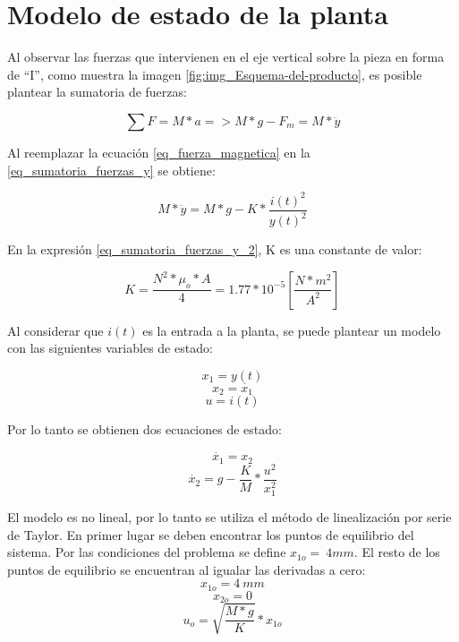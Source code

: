 \section{Modelo de estado de la planta}

\noindent Al observar las fuerzas que intervienen en el eje vertical sobre la pieza en forma de ``I'', como muestra la imagen \ref{fig:img_Esquema-del-producto}, es posible plantear la sumatoria de fuerzas:

\begin{equation}\label{eq_sumatoria_fuerzas_y}
	\sum F=M*a=>M*g-F_{m}=M*\ddot{y}
\end{equation}

\noindent Al reemplazar la ecuación \ref{eq_fuerza_magnetica} en la \ref{eq_sumatoria_fuerzas_y} se obtiene:

\begin{equation}\label{eq_sumatoria_fuerzas_y_2}
	M*\ddot{y}=M*g-K*\frac{i(t)^{2}}{y(t)^{2}}
\end{equation}

\noindent En la expresión \ref{eq_sumatoria_fuerzas_y_2}, K es una constante de valor:

\begin{equation}
	K=\frac{N^{2}*\mu_{o}*A}{4}=1.77*10^{-5} [\frac{N*m^2}{A^2}]
\end{equation}

\noindent Al considerar que $i(t)$ es la entrada a la planta, se puede plantear un modelo con las siguientes variables de estado:\newline

\begin{equation}
	x_{1}=y(t)
\end{equation}
\begin{equation}
	x_{2}=\dot{x_{1}}
\end{equation}
\begin{equation}
	u=i(t)
\end{equation}

\noindent Por lo tanto se obtienen dos ecuaciones de estado:

\begin{equation}
	\dot{x_{1}}=x_{2}
\end{equation}
\begin{equation}
	\dot{x_{2}}=g-\frac{K}{M}*\frac{u^{2}}{x_{1}^{2}}
\end{equation}

\noindent El modelo es no lineal, por lo tanto se utiliza el método de linealización por serie de Taylor. En primer lugar se deben encontrar los puntos de equilibrio del sistema. Por las condiciones del problema se define $x_{1o}=\:4mm$. El resto de los puntos de equilibrio se encuentran al igualar las derivadas a cero:
\begin{equation}
	x_{1o}=4\:mm
\end{equation}
\begin{equation}
	x_{2o}=0
\end{equation}
\begin{equation}
	u_{o}=\sqrt{\frac{M*g}{K}}*x_{1o}
\end{equation}

